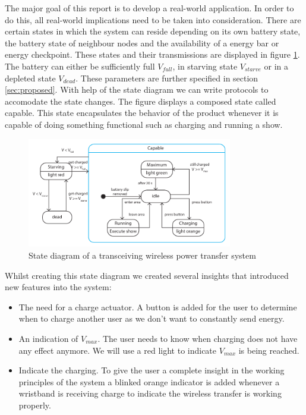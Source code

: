 %
The major goal of this report is to develop a real-world application. In order to do this, all real-world implications need to be taken into consideration. There are certain states in which the system can reside depending on its own battery state, the battery state of neighbour nodes and the availability of a energy bar or energy checkpoint. These states and their transmissions are displayed in figure \ref{fig:states}. The battery can either be sufficiently full $V_{full}$, in starving state $V_{starve}$ or in a depleted state $V_{dead}$. These parameters are further specified in section \ref{sec:proposed}. With help of the state diagram we can write protocols to accomodate the state changes. The figure displays a composed state called capable. This state encapsulates the behavior of the product whenever it is capable of doing something functional such as charging and running a show. 

\begin{figure}[h!]
\centering
\includegraphics[width=0.8\textwidth]{statediagram.pdf}
\caption{State diagram of a transceiving wireless power transfer system}
\label{fig:states}
\end{figure}

Whilst creating this state diagram we created several insights that introduced new features into the system:
\begin{itemize}
	\item The need for a charge actuator. A button is added for the user to determine when to charge another user as we don't want to constantly send energy. 
	\item An indication of $V_{max}$. The user needs to know when charging does not have any effect anymore. We will use a red light to indicate $V_{max}$ is being reached. 
	\item Indicate the charging. To give the user a complete insight in the working principles of the system a blinked orange indicator is added whenever a wristband is receiving charge to indicate the wireless transfer is working properly. 
\end{itemize}

